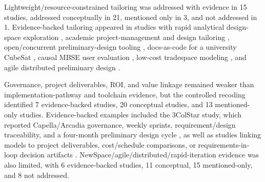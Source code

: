Lightweight/resource-constrained tailoring was addressed with evidence in 15 studies, addressed conceptually in 21, mentioned only in 3, and not addressed in 1.  Evidence-backed tailoring appeared in studies with rapid analytical design-space exploration \cite{paper-0012}, academic project-management and design tailoring \cite{paper-0023}, open/concurrent preliminary-design tooling \cite{paper-0027}, docs-as-code for a university CubeSat \cite{paper-0037}, causal MBSE user evaluation \cite{paper-0046}, low-cost tradespace modeling \cite{paper-0054}, and agile distributed preliminary design \cite{paper-0078}.

Governance, project deliverables, ROI, and value linkage remained weaker than implementation-pathway and toolchain evidence, but the controlled recoding identified 7 evidence-backed studies, 20 conceptual studies, and 13 mentioned-only studies.  Evidence-backed examples included the 3ColStar study, which reported Capella/Arcadia governance, weekly sprints, requirement/design traceability, and a four-month preliminary design cycle \cite{paper-0078}, as well as studies linking models to project deliverables, cost/schedule comparisons, or requirements-in-loop decision artifacts \cite{paper-0023,paper-0059,paper-0061}.  NewSpace/agile/distributed/rapid-iteration evidence was also limited, with 6 evidence-backed studies, 11 conceptual, 15 mentioned-only, and 8 not addressed.

